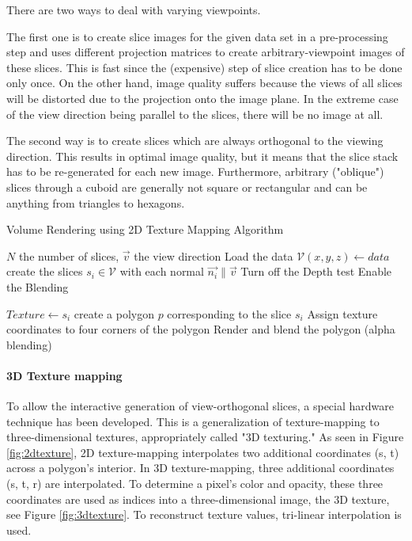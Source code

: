 There are two ways to deal with varying viewpoints.

The first one is to create slice images for the given data set in a pre-processing step and uses different projection matrices to create arbitrary-viewpoint images of these slices. This is fast since the (expensive) step of slice creation has to be done only once. On the other hand, image quality suffers because the views of all slices will be distorted due to the projection onto the image plane. In the extreme case of the view direction being parallel to the slices, there will be no image at all.

The second way is to create slices which are always orthogonal to the viewing direction. This results in optimal image quality, but it means that the slice stack has to be re-generated for each new image. Furthermore, arbitrary ("oblique") slices through a cuboid are generally not square or rectangular and can be anything from triangles to hexagons.

\begin{algorithm} \caption{Volume Rendering using 2D Texture Mapping Algorithm} 
\label{alg:tex2dmapping}
\begin{algorithmic}[1]
\Require $N$ the number of slices, $\vec{v} $ the view direction
\State Load the data $\mathcal V(x,y,z) \gets data$ 
\State create the slices $s_i \in \mathcal V$ with each normal $\vec{n_i} \parallel \vec{v}$
\State Turn off the Depth test 
\State Enable the Blending 

\State $Texture \gets s_i$
\State create a polygon $p$ corresponding to the slice $s_i$
\State Assign texture coordinates to four corners of the polygon
\State Render and blend the polygon (alpha blending) 
\EndFor

\end{algorithmic}
\end{algorithm}

\paragraph{3D Texture mapping}
To allow the interactive generation of view-orthogonal slices, a special hardware technique has been developed. This is a generalization of texture-mapping to three-dimensional textures, appropriately called "3D texturing."
As seen in Figure \ref{fig:2dtexture}, 2D texture-mapping interpolates two additional coordinates (s, t) across a polygon's interior. In 3D texture-mapping, three additional coordinates (s, t, r) are interpolated. To determine a pixel's color and opacity, these three coordinates are used as indices into a three-dimensional image, the 3D texture, see Figure \ref{fig:3dtexture}. To reconstruct texture values, tri-linear interpolation is used.

